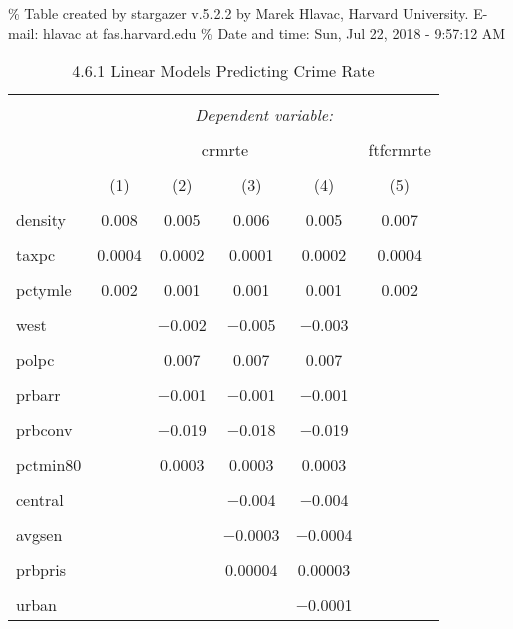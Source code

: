 \documentclass[]{article}
\begin{document}
\% Table created by stargazer v.5.2.2 by Marek Hlavac, Harvard
University. E-mail: hlavac at fas.harvard.edu \% Date and time: Sun, Jul
22, 2018 - 9:57:12 AM

\begin{table}[!htbp] \centering 
  \caption{4.6.1 Linear Models Predicting Crime Rate} 
  \label{} 
\begin{tabular}{@{\extracolsep{5pt}}lccccc} 
\\[-1.8ex]\hline 
\hline \\[-1.8ex] 
 & \multicolumn{5}{c}{\textit{Dependent variable:}} \\ 
\cline{2-6} 
\\[-1.8ex] & \multicolumn{4}{c}{crmrte} & ftfcrmrte \\ 
\\[-1.8ex] & (1) & (2) & (3) & (4) & (5)\\ 
\hline \\[-1.8ex] 
 density & 0.008 & 0.005 & 0.006 & 0.005 & 0.007 \\ 
  & & & & & \\ 
 taxpc & 0.0004 & 0.0002 & 0.0001 & 0.0002 & 0.0004 \\ 
  & & & & & \\ 
 pctymle & 0.002 & 0.001 & 0.001 & 0.001 & 0.002 \\ 
  & & & & & \\ 
 west &  & $-$0.002 & $-$0.005 & $-$0.003 &  \\ 
  & & & & & \\ 
 polpc &  & 0.007 & 0.007 & 0.007 &  \\ 
  & & & & & \\ 
 prbarr &  & $-$0.001 & $-$0.001 & $-$0.001 &  \\ 
  & & & & & \\ 
 prbconv &  & $-$0.019 & $-$0.018 & $-$0.019 &  \\ 
  & & & & & \\ 
 pctmin80 &  & 0.0003 & 0.0003 & 0.0003 &  \\ 
  & & & & & \\ 
 central &  &  & $-$0.004 & $-$0.004 &  \\ 
  & & & & & \\ 
 avgsen &  &  & $-$0.0003 & $-$0.0004 &  \\ 
  & & & & & \\ 
 prbpris &  &  & 0.00004 & 0.00003 &  \\ 
  & & & & & \\ 
 urban &  &  &  & $-$0.0001 &  \\ 

\end{tabular}
\end{table}
\end{document}
